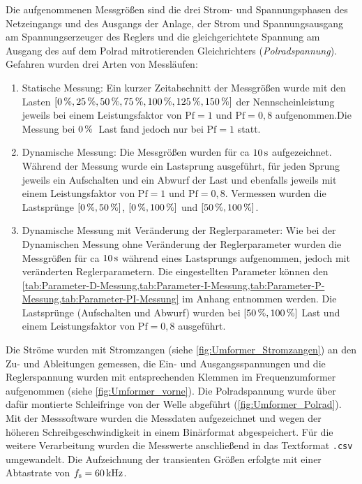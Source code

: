 Die aufgenommenen Messgrößen sind die drei Strom- und Spannungsphasen des Netzeingangs und des Ausgangs der Anlage, der Strom und Spannungsausgang am Spannungserzeuger des Reglers und die gleichgerichtete Spannung am Ausgang des auf dem Polrad mitrotierenden Gleichrichters (\emph{Polradspannung}). Gefahren wurden drei Arten von Messläufen: \begin{enumerate}
    \item Statische Messung: Ein kurzer Zeitabschnitt der Messgrößen wurde mit den Lasten $[\unit[0]{\%}, \unit[25]{\%}, \unit[50]{\%}, \unit[75]{\%}, \unit[100]{\%}, \unit[125]{\%}, \unit[150]{\%}]$ der Nennscheinleistung jeweils bei einem Leistungsfaktor von $\mathrm{Pf} = 1$ und $\mathrm{Pf} = 0,8$ aufgenommen.Die Messung bei $\unit[0]{\%}$~Last fand jedoch nur bei $\mathrm{Pf}=1$ statt.
    \item Dynamische Messung: Die Messgrößen wurden für ca $\unit[10]{s}$ aufgezeichnet. Während der Messung wurde ein Lastsprung ausgeführt, für jeden Sprung jeweils ein Aufschalten und ein Abwurf der Last und ebenfalls jeweils mit einem Leistungsfaktor von $\mathrm{Pf}=1$ und $\mathrm{Pf}=0,8$. Vermessen wurden die Lastsprünge $[\unit[0]{\%}, \unit[50]{\%}]$, $[\unit[0]{\%}, \unit[100]{\%}]$ und $[\unit[50]{\%}, \unit[100]{\%}]$.
    \item Dynamische Messung mit Veränderung der Reglerparameter: Wie bei der Dynamischen Messung ohne Veränderung der Reglerparameter wurden die Messgrößen für ca $\unit[10]{s}$ während eines Lastsprungs aufgenommen, jedoch mit veränderten Reglerparametern. Die eingestellten Parameter können den \cref{tab:Parameter-D-Messung,tab:Parameter-I-Messung,tab:Parameter-P-Messung,tab:Parameter-PI-Messung} im Anhang entnommen werden. Die Lastsprünge (Aufschalten und Abwurf) wurden bei $[\unit[50]{\%}, \unit[100]{\%}]$ Last und einem Leistungsfaktor von $\mathrm{Pf}=0,8$ ausgeführt.
\end{enumerate}

Die Ströme wurden mit Stromzangen (siehe \cref{fig:Umformer_Stromzangen}) an den Zu- und Ableitungen gemessen, die Ein- und Ausgangsspannungen und die Reglerspannung wurden mit entsprechenden Klemmen im Frequenzumformer aufgenommen (siehe \cref{fig:Umformer_vorne}). Die Polradspannung wurde über dafür montierte Schleifringe von der Welle abgeführt (\cref{fig:Umformer_Polrad}). Mit der Messsoftware wurden die Messdaten aufgezeichnet und wegen der höheren Schreibgeschwindigkeit in einem Binärformat abgespeichert. Für die weitere Verarbeitung wurden die Messwerte anschließend in das Textformat \texttt{.csv} umgewandelt. Die Aufzeichnung der transienten Größen erfolgte mit einer Abtastrate von $f_{\mathrm{s}}=\unit[60]{kHz}$.

